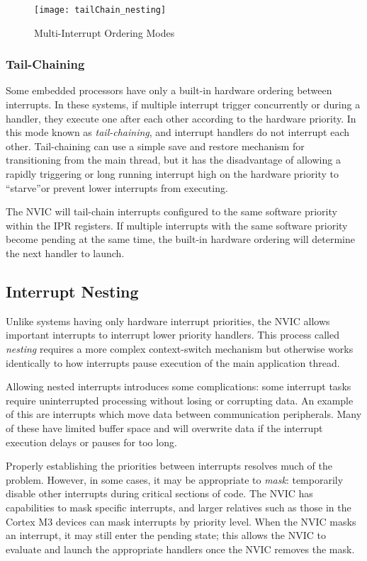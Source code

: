 \documentclass[11pt,fleqn]{book} %
\begin{document}
\begin{figure}[]
    \centering\texttt{[image: tailChain\_nesting]}
    \caption{Multi-Interrupt Ordering Modes}
    \label{tailChain_nesting}
\end{figure}

\subsubsection{Tail-Chaining}
Some embedded processors have only a built-in hardware ordering between interrupts. In these systems, if multiple interrupt trigger concurrently or during a handler, they execute one after each other according to the hardware priority. In this mode known as \textit{tail-chaining}, and interrupt handlers do not interrupt each other. Tail-chaining can use a simple save and restore mechanism for transitioning from the main thread, but it has the disadvantage of allowing a rapidly triggering or long running interrupt high on the hardware priority to ``starve''\textemdash or prevent lower interrupts from executing. 

The NVIC will tail-chain interrupts configured to the same software priority within the IPR registers. If multiple interrupts with the same software priority become pending at the same time, the built-in hardware ordering will determine the next handler to launch.

\subsection{Interrupt Nesting}
Unlike systems having only hardware interrupt priorities, the NVIC allows important interrupts to interrupt lower priority handlers. This process called \textit{nesting} requires a more complex context-switch mechanism but otherwise works identically to how interrupts pause execution of the main application thread. 

Allowing nested interrupts introduces some complications: some interrupt tasks require uninterrupted processing without losing or corrupting data. An example of this are interrupts which move data between communication peripherals. Many of these have limited buffer space and will overwrite data if the interrupt execution delays or pauses for too long. 

Properly establishing the priorities between interrupts resolves much of the problem. However, in some cases, it may be appropriate to \textit{mask}: temporarily disable other interrupts during critical sections of code. The NVIC has capabilities to mask specific interrupts, and larger relatives such as those in the Cortex M3 devices can mask interrupts by priority level. When the NVIC masks an interrupt, it may still enter the pending state; this allows the NVIC to evaluate and launch the appropriate handlers once the NVIC removes the mask.
\end{document}
